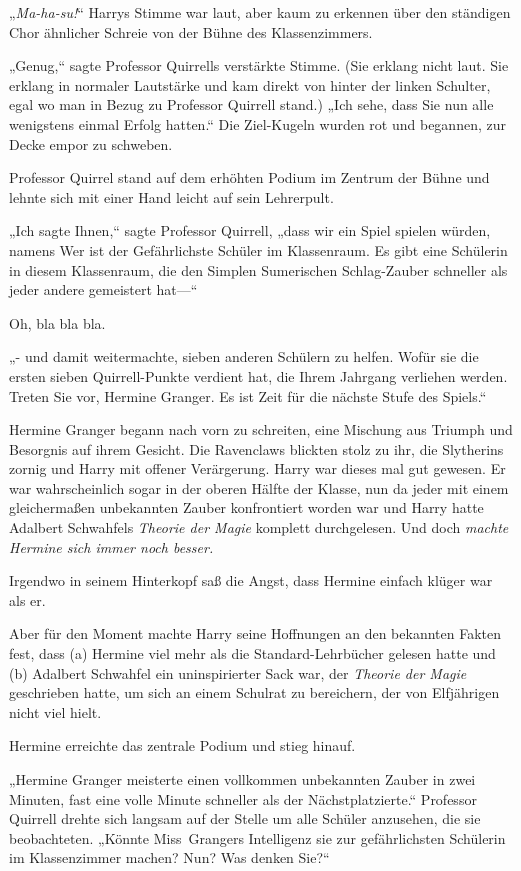 {„\emph{Ma-ha-su!}“ Harrys Stimme war laut, aber kaum zu erkennen über den ständigen Chor ähnlicher Schreie von der Bühne des Klassenzimmers.

„Genug,“ sagte Professor Quirrells verstärkte Stimme. (Sie erklang nicht laut. Sie erklang in normaler Lautstärke und kam direkt von hinter der linken Schulter, egal wo man in Bezug zu Professor Quirrell stand.) „Ich sehe, dass Sie nun alle wenigstens einmal Erfolg hatten.“ Die Ziel-Kugeln wurden rot und begannen, zur Decke empor zu schweben.

Professor Quirrel stand auf dem erhöhten Podium im Zentrum der Bühne und lehnte sich mit einer Hand leicht auf sein Lehrerpult.

„Ich sagte Ihnen,“ sagte Professor Quirrell, „dass wir ein Spiel spielen würden, namens Wer ist der Gefährlichste Schüler im Klassenraum. Es gibt eine Schülerin in diesem Klassenraum, die den Simplen Sumerischen Schlag-Zauber schneller als jeder andere gemeistert hat—“

Oh, bla bla bla.

„- und damit weitermachte, sieben anderen Schülern zu helfen. Wofür sie die ersten sieben Quirrell-Punkte verdient hat, die Ihrem Jahrgang verliehen werden. Treten Sie vor, Hermine Granger. Es ist Zeit für die nächste Stufe des Spiels.“

Hermine Granger begann nach vorn zu schreiten, eine Mischung aus Triumph und Besorgnis auf ihrem Gesicht. Die Ravenclaws blickten stolz zu ihr, die Slytherins zornig und Harry mit offener Verärgerung. Harry war dieses mal gut gewesen. Er war wahrscheinlich sogar in der oberen Hälfte der Klasse, nun da jeder mit einem gleichermaßen unbekannten Zauber konfrontiert worden war und Harry hatte Adalbert Schwahfels \emph{Theorie der Magie} komplett durchgelesen. Und doch \emph{machte Hermine sich immer noch besser.}

Irgendwo in seinem Hinterkopf saß die Angst, dass Hermine einfach klüger war als er.

Aber für den Moment machte Harry seine Hoffnungen an den bekannten Fakten fest, dass (a) Hermine viel mehr als die Standard-Lehrbücher gelesen hatte und (b) Adalbert Schwahfel ein uninspirierter Sack war, der \emph{Theorie der Magie} geschrieben hatte, um sich an einem Schulrat zu bereichern, der von Elfjährigen nicht viel hielt.

Hermine erreichte das zentrale Podium und stieg hinauf.

„Hermine Granger meisterte einen vollkommen unbekannten Zauber in zwei Minuten, fast eine volle Minute schneller als der Nächstplatzierte.“ Professor Quirrell drehte sich langsam auf der Stelle um alle Schüler anzusehen, die sie beobachteten. „Könnte Miss~Grangers Intelligenz sie zur gefährlichsten Schülerin im Klassenzimmer machen? Nun? Was denken Sie?“

}
